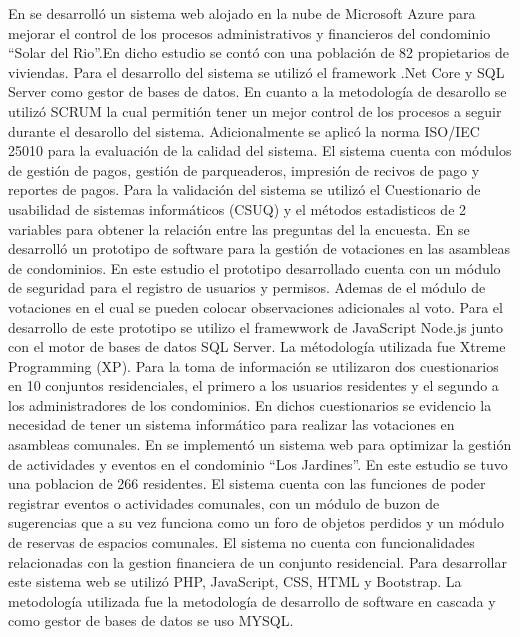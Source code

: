 \bigbreak
En\cite{moreiraDESARROLLOSISTEMAWEB2019} se desarrolló un sistema web alojado en la nube de Microsoft Azure para mejorar el control de los procesos administrativos y financieros del condominio {\textquotedblleft}Solar del Rio{\textquotedblright}.En dicho estudio se contó con una población de 82 propietarios de viviendas. Para el desarrollo del sistema se utilizó el framework .Net Core y SQL Server como gestor de bases de datos. En cuanto a la metodología de desarollo se utilizó SCRUM la cual permitión tener un mejor control de los procesos a seguir durante el desarollo del sistema. Adicionalmente se aplicó la norma ISO/IEC 25010 para la evaluación de la calidad del sistema. El sistema cuenta con módulos de gestión de pagos, gestión de parqueaderos, impresión de recivos de pago y reportes de pagos. Para la validación del sistema se utilizó el Cuestionario de usabilidad de sistemas informáticos (CSUQ) y el métodos estadisticos de 2 variables para obtener la relación entre las preguntas del la encuesta.
\bigbreak
En\cite{lopezPROTOTIPOSOFTWAREWEB2020} se desarrolló un prototipo de software para la gestión de votaciones en las asambleas de condominios. En este estudio el prototipo desarrollado cuenta con un módulo de seguridad para el registro de usuarios y permisos. Ademas de el módulo de votaciones en el cual se pueden colocar observaciones adicionales al voto. Para el desarrollo de este prototipo se utilizo el framewwork de JavaScript Node.js junto con el motor de bases de datos SQL Server. La métodología utilizada fue Xtreme Programming (XP). Para la toma de información se utilizaron dos cuestionarios en 10 conjuntos residenciales, el primero a los usuarios residentes y el segundo a los administradores de los condominios. En dichos cuestionarios se evidencio la necesidad de tener un sistema informático para realizar las votaciones en asambleas comunales.
\bigbreak
En\cite{ortegaPrototipoSistemaWeb2020} se implementó un sistema web para optimizar la gestión de actividades y eventos en el condominio {\textquotedblleft}Los Jardines{\textquotedblright}. En este estudio se tuvo una poblacion de 266 residentes. El sistema cuenta con las funciones de poder registrar eventos o actividades comunales, con un módulo de buzon de sugerencias que a su vez funciona como un foro de objetos perdidos y un módulo de reservas de espacios comunales. El sistema no cuenta con funcionalidades relacionadas con la gestion financiera de un conjunto residencial. Para desarrollar este sistema web se utilizó PHP, JavaScript, CSS, HTML y Bootstrap. La metodología utilizada fue la metodología de desarrollo de software en cascada y como gestor de bases de datos se uso MYSQL.
